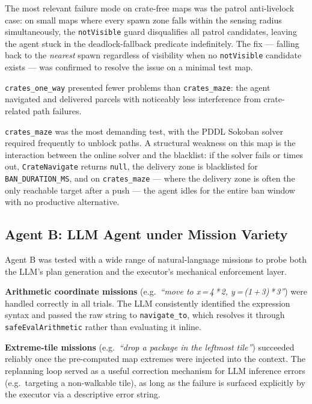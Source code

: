 \documentclass[10pt,a4paper,twocolumn]{article}
\begin{document}
The most relevant failure mode on crate-free maps was the patrol
anti-livelock case: on small maps where every spawn zone falls within the
sensing radius simultaneously, the \texttt{notVisible} guard disqualifies
all patrol candidates, leaving the agent stuck in the deadlock-fallback
predicate indefinitely.  The fix — falling back to the \emph{nearest}
spawn regardless of visibility when no \texttt{notVisible} candidate
exists — was confirmed to resolve the issue on a minimal test map.

\texttt{crates\_one\_way} presented fewer problems than \texttt{crates\_maze}:
the agent navigated and delivered parcels with noticeably less interference
from crate-related path failures.

\texttt{crates\_maze} was the most demanding test, with the PDDL Sokoban
solver required frequently to unblock paths.  A structural weakness on this
map is the interaction between the online solver and the blacklist: if the
solver fails or times out, \texttt{CrateNavigate} returns \texttt{null}, the
delivery zone is blacklisted for \texttt{BAN\_DURATION\_MS}, and on
\texttt{crates\_maze} --- where the delivery zone is often the only reachable
target after a push --- the agent idles for the entire ban window with no
productive alternative.

\subsection{Agent B: LLM Agent under Mission Variety}

Agent B was tested with a wide range of natural-language missions to probe
both the LLM's plan generation and the executor's mechanical enforcement layer.

\textbf{Arithmetic coordinate missions} (e.g.\ \emph{``move to
x\,=\,4\,*\,2, y\,=\,(1\,+\,3)\,*\,3''}) were handled correctly in all
trials.  The LLM consistently identified the expression syntax and passed
the raw string to \texttt{navigate\_to}, which resolves it through
\texttt{safeEvalArithmetic} rather than evaluating it inline.

\textbf{Extreme-tile missions} (e.g.\ \emph{``drop a package in the
leftmost tile''}) succeeded reliably once the pre-computed map extremes
were injected into the context.  The replanning loop served as a useful
correction mechanism for LLM inference errors (e.g.\ targeting a
non-walkable tile), as long as the failure is surfaced explicitly by the
executor via a descriptive error string.
\end{document}
